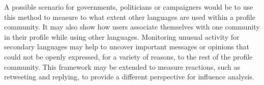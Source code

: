 \documentclass{llncs}
\begin{document}
A possible scenario for governments, politicians or campaigners would be
to use this method to measure to what extent other languages are used
within a profile community. It may also show how users associate
themselves with one community in their profile while using other
languages. Monitoring unusual activity for secondary languages may
help to uncover important messages or opinions that could not be
openly expressed, for a variety of reasons, to the rest of the profile
community. This framework may be extended to measure reactions,
such as retweeting and replying, to provide a different perspective 
for influence analysis.




\end{document}
